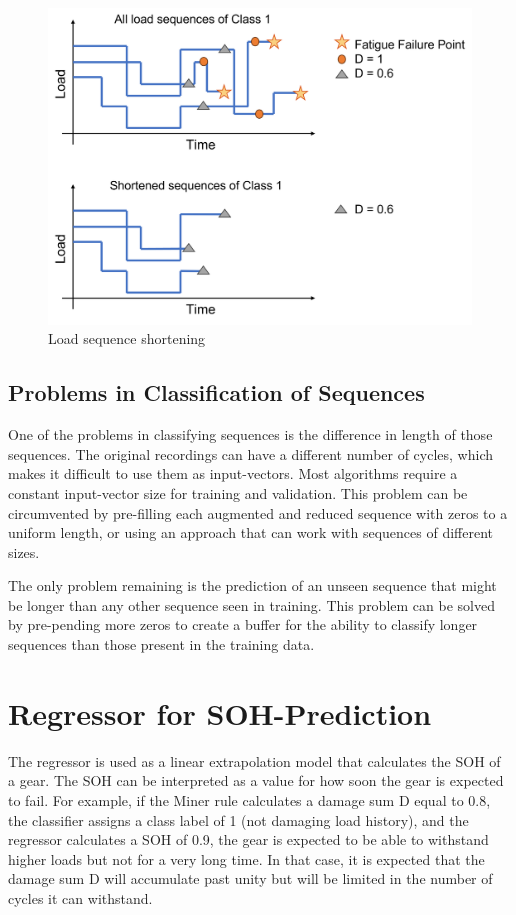 \begin{figure}[H]
	\centering
	\includegraphics[width=0.8\linewidth]{IMGs/Shortened.png}
	\caption{Load sequence shortening}
	\label{fig:Shortened}
\end{figure}

\subsection{Problems in Classification of Sequences}
One of the problems in classifying sequences is the difference in length of those sequences. The original recordings can have a different number of cycles, which makes it difficult to use them as input-vectors. Most algorithms require a constant input-vector size for training and validation. This problem can be circumvented by pre-filling each augmented and reduced sequence with zeros to a uniform length, or using an approach that can work with sequences of different sizes. 


The only problem remaining is the prediction of an unseen sequence that might be longer than any other sequence seen in training.
This problem can be solved by pre-pending more zeros to create a buffer for the ability to classify longer sequences than those present in the training data.


\newpage
\section{Regressor for SOH-Prediction}
The regressor is used as a linear extrapolation model that calculates the SOH of a gear. The SOH can be interpreted as a value for how soon the gear is expected to fail. For example, if the Miner rule calculates a damage sum D equal to 0.8, the classifier assigns a class label of 1 (not damaging load history), and the regressor calculates a SOH of 0.9, the gear is expected to be able to withstand higher loads but not for a very long time. In that case, it is expected that the damage sum D will accumulate past unity but will be limited in the number of cycles it can withstand. 

